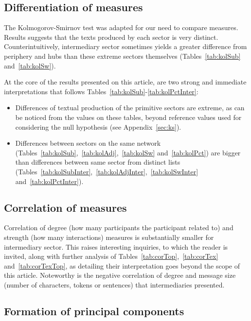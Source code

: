 \documentclass[%
 aip,
 jmp,%
 amsmath,amssymb,
 reprint,%
]{revtex4-1}
\begin{document}
\subsection{Differentiation of measures}\label{subsec:di}
The Kolmogorov-Smirnov test was adapted for our need to compare measures.
Results suggests that the texts produced by each sector is very distinct.
Counterintuitively, intermediary sector sometimes yields a greater difference from periphery and hubs than these extreme sectors themselves (Tables~\ref{tab:kolSub} and~\ref{tab:kolSw}).

At the core of the results presented on this article, are two strong and immediate interpretations that follows Tables~\ref{tab:kolSub}-\ref{tab:kolPctInter}:
\begin{itemize}
    \item Differences of textual production of the primitive sectors are extreme, as can be noticed from the values on these tables, beyond reference values used for considering the null hypothesis (see Appendix~\ref{sec:ks}).
    \item Differences between sectors on the same network (Tables~\ref{tab:kolSub},~\ref{tab:kolAdj},~\ref{tab:kolSw} and~\ref{tab:kolPct}) are bigger than differences between same sector from distinct lists (Tables~\ref{tab:kolSubInter},~\ref{tab:kolAdjInter},~\ref{tab:kolSwInter} and~\ref{tab:kolPctInter}).
\end{itemize}

\subsection{Correlation of measures}\label{subsec:cor}

Correlation of degree (how many participants the participant related to) and strength (how many interactions) measures is substantially smaller for intermediary sector. This raises interesting inquiries, to which the reader is invited, along with further analysis of Tables~\ref{tab:corTop},~\ref{tab:corTex} and~\ref{tab:corTexTop}, as detailing their interpretation goes beyond the scope of this article. Noteworthy is the negative correlation of degree and message size (number of characters, tokens or sentences) that intermediaries presented.

\subsection{Formation of principal components}\label{subsec:pc}
\end{document}
